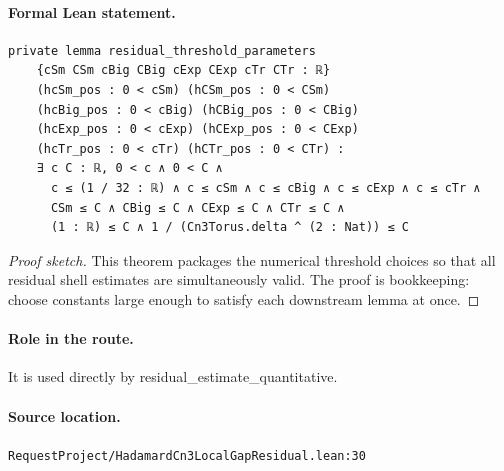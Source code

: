 \medskip
\paragraph{Formal Lean statement.}
\begin{verbatim}
private lemma residual_threshold_parameters
    {cSm CSm cBig CBig cExp CExp cTr CTr : ℝ}
    (hcSm_pos : 0 < cSm) (hCSm_pos : 0 < CSm)
    (hcBig_pos : 0 < cBig) (hCBig_pos : 0 < CBig)
    (hcExp_pos : 0 < cExp) (hCExp_pos : 0 < CExp)
    (hcTr_pos : 0 < cTr) (hCTr_pos : 0 < CTr) :
    ∃ c C : ℝ, 0 < c ∧ 0 < C ∧
      c ≤ (1 / 32 : ℝ) ∧ c ≤ cSm ∧ c ≤ cBig ∧ c ≤ cExp ∧ c ≤ cTr ∧
      CSm ≤ C ∧ CBig ≤ C ∧ CExp ≤ C ∧ CTr ≤ C ∧
      (1 : ℝ) ≤ C ∧ 1 / (Cn3Torus.delta ^ (2 : Nat)) ≤ C
\end{verbatim}
\begin{proof}[Proof sketch]
This theorem packages the numerical threshold choices so that all residual shell estimates are simultaneously valid. The proof is bookkeeping: choose constants large enough to satisfy each downstream lemma at once.
\end{proof}
\paragraph{Role in the route.}
It is used directly by residual\_estimate\_quantitative.
\paragraph{Source location.}
\texttt{RequestProject/HadamardCn3LocalGapResidual.lean:30}
\medskip
